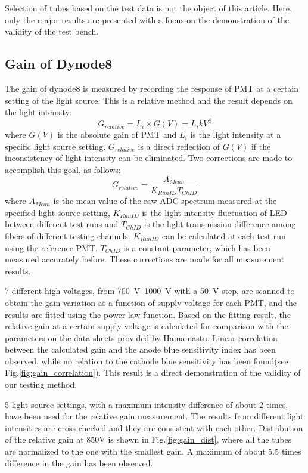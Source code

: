 \documentclass[5p, times]{elsarticle}
\begin{document}
Selection of tubes based on the test data is not the object of this article.
Here, only the major results are presented with a focus on the demonstration of the validity of the test bench. 

\subsection{Gain of Dynode8}
\label{sec:psd_gain}

The gain of dynode8 is measured by recording the response of PMT at a certain setting of the light source. 
This is a relative method and the result depends on the light intensity:
\begin{equation}
 G_{relative} = L_i \times G(V) = L_i k V^\beta
\end{equation}
where $G(V)$ is the absolute gain of PMT and $L_i$ is the light intensity at a specific light source setting.
$G_{relative}$ is a direct reflection of $G(V)$ if the inconsistency of light intensity can be eliminated.
Two corrections are made to accomplish this goal, as follows: 
\begin{equation}
 G_{relative} = \frac{A_{Mean}}{K_{RunID} T_{ChID}}
\end{equation} 
where $A_{Mean}$ is the mean value of the raw ADC spectrum measured at the specified light source setting,
$K_{RunID}$ is the light intensity fluctuation of LED between different test runs and $T_{ChID}$ is the light transmission difference among fibers of different testing channels.
$K_{RunID}$ can be calculated at each test run using the reference PMT.
$T_{ChID}$ is a constant parameter, which has been measured accurately before.
These corrections are made for all measurement results.

7 different high voltages, from \SIrange{700}{1000}{\volt} with a \SI{50}{\volt} step, are scanned to obtain the gain variation as a function of supply voltage for each PMT, and the results are fitted using the power law function.
Based on the fitting result, the relative gain at a certain supply voltage is calculated for comparison with the parameters on the data sheets provided by Hamamastu.
Linear correlation between the calculated gain and the anode blue sensitivity index has been observed, while no relation to the cathode blue sensitivity has been found(see Fig.\ref{fig:gain_correlation}).
This result is a direct demonstration of the validity of our testing method.

5 light source settings, with a maximum intensity difference of about 2 times, have been used for the relative gain measurement.
The results from different light intensities are cross checked and they are consistent with each other.
Distribution of the relative gain at 850V is shown in Fig.\ref{fig:gain_dist}, where all the tubes are normalized to the one with the smallest gain. 
A maximum of about 5.5 times difference in the gain has been observed.
\end{document}
